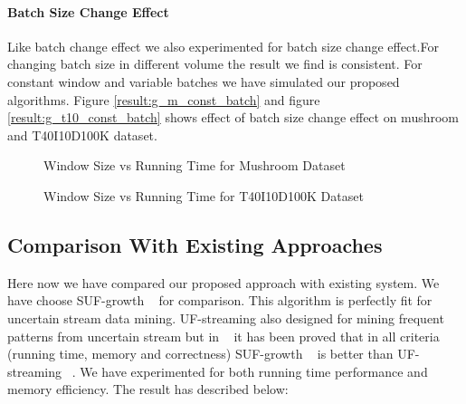 	\paragraph{Batch Size Change Effect}Like batch change effect we also experimented for batch size change effect.For changing batch size in different volume the result we find is consistent. For constant window and variable batches we have simulated our proposed algorithms. Figure \ref{result:g_m_const_batch} and figure \ref{result:g_t10_const_batch} shows effect of batch size change effect on mushroom and T40I10D100K dataset.
		\begin{figure}[h]
		\centering
			
		\caption{Window Size vs Running Time for Mushroom Dataset ~\cite{dataset}}
		\label{result:g_m_const_win}
		\end{figure}
		\begin{figure}[h]
		\centering
			
		\caption{Window Size vs Running Time for T40I10D100K Dataset ~\cite{dataset}}
		\label{result:g_t10_const_win}
		\end{figure}
\clearpage
\subsection{Comparison With Existing Approaches}
Here now we have compared our proposed approach with existing system. We have choose SUF-growth ~\cite{suf_growth}  for comparison. This algorithm is perfectly fit for uncertain stream data mining. UF-streaming also designed for mining frequent patterns from uncertain stream but in ~\cite{suf_growth} it has been proved that in all criteria (running time, memory and correctness) SUF-growth ~\cite{suf_growth} is better than UF-streaming ~\cite{suf_growth}. We have experimented for both running time performance and memory efficiency. The result has described below:
